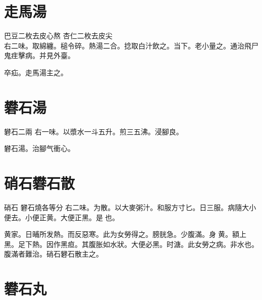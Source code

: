 \section{走馬湯}

巴豆{\scriptsize 二枚去皮心熬} 杏仁{\scriptsize 二枚{\khaai 去皮尖}}\\
右二味。取綿纏。槌令碎。熱湯二合。捻取白汁飲之。当下。老小量之。通治飛尸鬼{\khaai 疰}擊病。{\scriptsize {\khaai 并見外臺。}}

卒疝。走馬湯主之。



\section{礬石湯}

礬石{\scriptsize 二兩} 
右一味。以漿水一斗五升。煎三五沸。浸腳良。

礬石湯。治腳气衝心。

\section{硝石礬石散}

硝石{ }礬石{\scriptsize 燒各等分} 
右二味。为散。以大麥粥汁。和服方寸匕。日三服。病隨大小便去。小便正黄。大便正黑。是{\sungii 𠊱}也。

黄家。日晡所发熱。而反惡寒。此为女勞得之。膀胱急。少腹滿。身{\sungii 𥁞}黄。額上黑。足下熱。因作黑疸。其腹胀如水狀。大便必黑。时溏。此女勞之病。非水也。腹滿者難治。硝石礬石散主之。

\section{礬石丸}

